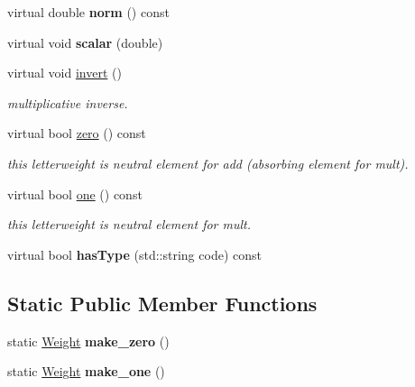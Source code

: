 \begin{DoxyCompactItemize}
virtual double {\bfseries norm} () const
\item 
virtual void {\bfseries scalar} (double)
\item 
virtual void \mbox{\hyperlink{group__weight_ga1fa4dd503a5f4915df2f9c5663aeeaeb}{invert}} ()
\begin{DoxyCompactList}\small\item\em multiplicative inverse. \end{DoxyCompactList}\item 
virtual bool \mbox{\hyperlink{group__weight_ga35f29b2dcd594cc2cfac884322095c16}{zero}} () const
\begin{DoxyCompactList}\small\item\em this letterweight is neutral element for add (absorbing element for mult). \end{DoxyCompactList}\item 
virtual bool \mbox{\hyperlink{group__weight_ga31f697ce8283cf19cd1b2f9520c83cde}{one}} () const
\begin{DoxyCompactList}\small\item\em this letterweight is neutral element for mult. \end{DoxyCompactList}\item 
\mbox{\label{classViterbiWeight_a115d43704bf01603dad9cda0d28292bf}} 
virtual bool {\bfseries has\+Type} (std\+::string code) const
\end{DoxyCompactItemize}
\subsection*{Static Public Member Functions}
\begin{DoxyCompactItemize}
\item 
\mbox{\label{classViterbiWeight_a4906fd4ccbcbf5a9617d40a73afd778b}} 
static \mbox{\hyperlink{classWeight}{Weight}} {\bfseries make\+\_\+zero} ()
\item 
\mbox{\label{classViterbiWeight_a175ce9e3ea9e87e8a28f34c4655544be}} 
static \mbox{\hyperlink{classWeight}{Weight}} {\bfseries make\+\_\+one} ()
\end{DoxyCompactItemize}

